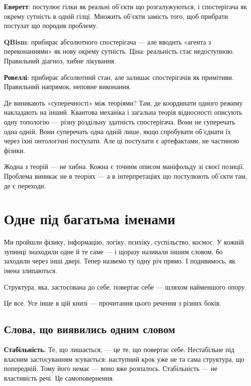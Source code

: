 \documentclass[12pt, a4paper, openany]{book}
\begin{document}
\textbf{Еверетт}: постулює гілки як реальні об'єкти що розгалужуються, і спостерігача як окрему сутність в одній гілці. Множить об'єкти замість того, щоб прибрати постулат що породив проблему.

\textbf{QBism}: прибирає абсолютного спостерігача — але вводить «агента з переконаннями» як нову окрему сутність. Ціна: реальність стає недоступною. Правильний діагноз, хибне лікування.

\textbf{Ровеллі}: прибирає абсолютний стан, але залишає спостерігачів як примітиви. Правильний напрямок, неповне виконання.

Де виникають «суперечності» між теоріями? Там, де координати одного режиму накладають на інший. Квантова механіка і загальна теорія відносності описують одну топологію — різну роздільну здатність спостерігача. Вони не суперечать одна одній. Вони суперечать одна одній лише, якщо спробувати об'єднати їх через їхні онтологічні постулати. Але ці постулати є артефактами, не частиною фізики.

Жодна з теорій — не хибна. Кожна є точним описом маніфольду зі своєї позиції. Проблема виникає не в теоріях — а в інтерпретаціях що постулюють об'єкти там, де є переходи.



\chapter{Одне під багатьма іменами}

Ми пройшли фізику, інформацію, логіку, психіку, суспільство, космос. У кожній зупинці знаходили одне й те саме --- і щоразу називали іншим словом, бо заходили через інші двері. Тепер назвемо ту одну річ прямо. І подивимось, як імена злипаються.

\begin{defbox}
Структура, яка, застосована до себе, повертає себе --- шляхом найменшого опору.
\end{defbox}

Це все. Усе інше в цій книзі --- прочитання цього речення з різних боків.

\section{Слова, що виявились одним словом}

\textbf{Стабільність.} Те, що лишається, --- це те, що повертає себе. Нестабільне під власним застосуванням зсувається: наступний крок уже не та сама структура, що попередній. Тому його немає --- воно вже розпалось. Стабільність --- не властивість речі. Це самоповернення.
\end{document}
